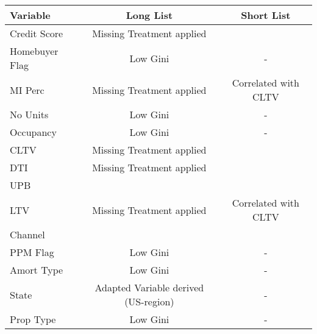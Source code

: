 \begin{longtable}{ l c c }\toprule    
\textbf{Variable}           & \textbf{Long List} 											& \textbf{Short List}						 \\\midrule
Credit Score                & \cellcolor[HTML]{C0F0C0}Missing Treatment applied            & \cellcolor[HTML]{C0F0C0}                     \\
Homebuyer Flag              & \cellcolor[HTML]{F7D9E1}Low Gini                             & -                                            \\
MI Perc                     & \cellcolor[HTML]{C0F0C0}Missing Treatment applied            & \cellcolor[HTML]{F7D9E1}Correlated with CLTV \\
No Units                    & \cellcolor[HTML]{F7D9E1}Low Gini                             & -                                            \\
Occupancy                   & \cellcolor[HTML]{F7D9E1}Low Gini                             & -                                            \\
CLTV                        & \cellcolor[HTML]{C0F0C0}Missing Treatment applied            & \cellcolor[HTML]{C0F0C0}                     \\
DTI                         & \cellcolor[HTML]{C0F0C0}Missing Treatment applied            & \cellcolor[HTML]{C0F0C0}                     \\
UPB                         & \cellcolor[HTML]{C0F0C0}                                     & \cellcolor[HTML]{C0F0C0}                     \\
LTV                         & \cellcolor[HTML]{C0F0C0}Missing Treatment applied            & \cellcolor[HTML]{F7D9E1}Correlated with CLTV \\
Channel                     & \cellcolor[HTML]{C0F0C0}                                     & \cellcolor[HTML]{C0F0C0}                     \\
PPM Flag                    & \cellcolor[HTML]{F7D9E1}Low Gini                             & -                                            \\
Amort Type                  & \cellcolor[HTML]{F7D9E1}Low Gini                             & -                                            \\
State                       & \cellcolor[HTML]{F7D9E1}Adapted Variable derived (US-region) & -                                            \\
Prop Type                   & \cellcolor[HTML]{F7D9E1}Low Gini                             & -                                            \\

\end{longtable}
